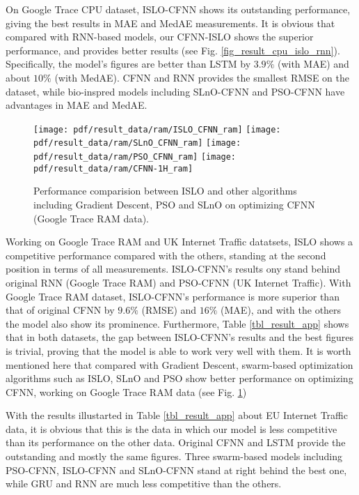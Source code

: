 \documentclass[../main.tex]{subfiles}
\begin{document}
	On Google Trace CPU dataset, ISLO-CFNN shows its outstanding performance, giving the best results in MAE and MedAE measurements. It is obvious that compared with RNN-based models, our CFNN-ISLO shows the superior performance, and provides better results (see Fig. \ref{fig_result_cpu_islo_rnn}). Specifically, the model's figures are better than LSTM by $3.9 \%$ (with MAE) and about $10 \%$ (with MedAE). CFNN and RNN provides the smallest RMSE on the dataset, while bio-inspred models including SLnO-CFNN and PSO-CFNN have advantages in MAE and MedAE.
	
\begin{figure}[!ht] 
   \centering
   	\texttt{[image: pdf/result\_data/ram/ISLO\_CFNN\_ram]}
  	 \texttt{[image: pdf/result\_data/ram/SLnO\_CFNN\_ram]}
  	 \texttt{[image: pdf/result\_data/ram/PSO\_CFNN\_ram]}
  	 \texttt{[image: pdf/result\_data/ram/CFNN-1H\_ram]}
	
  \caption{Performance comparision between ISLO and other algorithms including Gradient Descent, PSO and SLnO on optimizing CFNN (Google Trace RAM data).} 
  \label{fig_result_ram} 
\end{figure}
	
	Working on Google Trace RAM and UK Internet Traffic datatsets, ISLO shows a competitive performance compared with the others, standing at the second position in terms of all measurements. ISLO-CFNN's results ony stand behind original RNN (Google Trace RAM) and PSO-CFNN (UK Internet Traffic). With Google Trace RAM dataset, ISLO-CFNN's performance is more superior than that of original CFNN by $9.6 \%$ (RMSE) and $16 \%$ (MAE), and with the others the model also show its prominence. Furthermore, Table \ref{tbl_result_app} shows that in both datasets, the gap between ISLO-CFNN's results and the best figures is trivial, proving that the model is able to work very well with them. It is worth mentioned here that compared with Gradient Descent, swarm-based optimization algorithms such as ISLO, SLnO and PSO show better performance on optimizing CFNN, working on Google Trace RAM data (see Fig. \ref{fig_result_ram})
	
	With the results illustarted in Table \ref{tbl_result_app} about EU Internet Traffic data, it is obvious that this is the data in which our model is less competitive than its performance on the other data. Original CFNN and LSTM provide the outstanding and mostly the same figures. Three swarm-based models including PSO-CFNN, ISLO-CFNN and SLnO-CFNN stand at right behind the best one, while GRU and RNN are much less competitive than the others.
\end{document}
